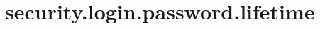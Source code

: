\section{security.login.password.lifetime}
\label{configuration:SecurityLoginPasswordLifetime}
\AvailableInJavaOnly{\TODO}